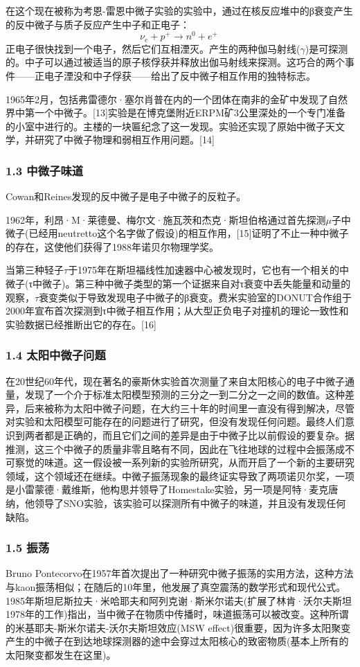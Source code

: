 在这个现在被称为考恩-雷恩中微子实验的实验中，通过在核反应堆中的β衰变产生的反中微子与质子反应产生中子和正电子：
$$\nu_e+p^+\to n^0+e^+~$$
正电子很快找到一个电子，然后它们互相湮灭。产生的两种伽马射线($\gamma$)是可探测的。中子可以通过被适当的原子核俘获并释放出伽马射线来探测。这巧合的两个事件——正电子湮没和中子俘获——给出了反中微子相互作用的独特标志。

1965年2月，包括弗雷德尔·塞尔肖普在内的一个团体在南非的金矿中发现了自然界中第一个中微子。[13]实验是在博克堡附近ERPM矿3公里深处的一个专门准备的小室中进行的。主楼的一块匾纪念了这一发现。实验还实现了原始中微子天文学，并研究了中微子物理和弱相互作用问题。[14]

\subsubsection{1.3 中微子味道}
Cowan和Reines发现的反中微子是电子中微子的反粒子。

1962年，利昂·M·莱德曼、梅尔文·施瓦茨和杰克·斯坦伯格通过首先探测$\mu$子中微子(已经用neutretto这个名字做了假设)的相互作用，[15]证明了不止一种中微子的存在，这使他们获得了1988年诺贝尔物理学奖。

当第三种轻子$\tau$于1975年在斯坦福线性加速器中心被发现时，它也有一个相关的中微子(τ中微子)。第三种中微子类型的第一个证据来自对τ衰变中丢失能量和动量的观察，$\tau$衰变类似于导致发现电子中微子的β衰变。费米实验室的DONUT合作组于2000年宣布首次探测到τ中微子相互作用；从大型正负电子对撞机的理论一致性和实验数据已经推断出它的存在。[16]

\subsubsection{1.4 太阳中微子问题}
在20世纪60年代，现在著名的豪斯休实验首次测量了来自太阳核心的电子中微子通量，发现了一个介于标准太阳模型预测的三分之一到二分之一之间的数值。这种差异，后来被称为太阳中微子问题，在大约三十年的时间里一直没有得到解决，尽管对实验和太阳模型可能存在的问题进行了研究，但没有发现任何问题。最终人们意识到两者都是正确的，而且它们之间的差异是由于中微子比以前假设的要复杂。据推测，这三个中微子的质量非零且略有不同，因此在飞往地球的过程中会振荡成不可察觉的味道。这一假设被一系列新的实验所研究，从而开启了一个新的主要研究领域，这个领域还在继续。中微子振荡现象的最终证实导致了两项诺贝尔奖，一项是小雷蒙德·戴维斯，他构思并领导了Homestake实验，另一项是阿特·麦克唐纳，他领导了SNO实验，该实验可以探测所有中微子的味道，并且没有发现任何缺陷。

\subsubsection{1.5 振荡}
Bruno Pontecorvo在1957年首次提出了一种研究中微子振荡的实用方法，这种方法与kaon振荡相似；在随后的10年里，他发展了真空震荡的数学形式和现代公式。1985年斯坦尼斯拉夫·米哈耶夫和阿列克谢·斯米尔诺夫(扩展了林肯·沃尔夫斯坦1978年的工作)指出，当中微子在物质中传播时，味道振荡可以被改变。这种所谓的米基耶夫-斯米尔诺夫-沃尔夫斯坦效应(MSW effect)很重要，因为许多太阳聚变产生的中微子在到达地球探测器的途中会穿过太阳核心的致密物质(基本上所有的太阳聚变都发生在这里)。

